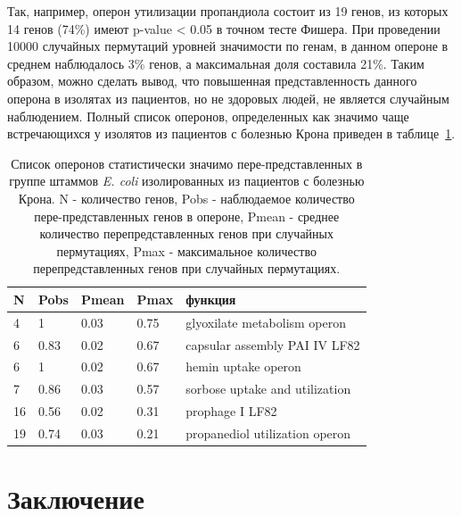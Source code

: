 Так, например, оперон утилизации пропандиола состоит из 19 генов, из которых 14 генов (74\%) имеют p-value < 0.05 в точном тесте Фишера. При проведении 10000 случайных пермутаций уровней значимости по генам, в данном опероне в среднем наблюдалось 3\% генов, а максимальная доля составила 21\%. Таким образом, можно сделать вывод, что повышенная представленность данного оперона в изолятах из пациентов, но не здоровых людей, не является случайным наблюдением. Полный список оперонов, определенных как значимо чаще встречающихся у изолятов из пациентов с болезнью Крона приведен в таблице~\ref{tbl:ops1}. 

\begin{table}[htbp]
\centering
\caption{Список оперонов статистически значимо пере-представленных в группе штаммов \textit{E. coli} изолированных из пациентов с болезнью Крона. N - количество генов, Pobs - наблюдаемое количество пере-представленных генов в опероне, Pmean - среднее количество перепредставленных генов при случайных пермутациях, Pmax - максимальное количество перепредставленных генов при случайных пермутациях.}
\label{tbl:ops1}
\begin{tabular}{|l|l|l|l|l|}
\hline
\textbf{N} & \textbf{Pobs} & \textbf{Pmean} & \textbf{Pmax} & \textbf{функция}                                  \\ \hline
4          & 1             & 0.03          & 0.75         & glyoxilate metabolism operon \\ \hline
6          & 0.83          & 0.02          & 0.67         & capsular assembly PAI IV LF82                              \\ \hline
6          & 1             & 0.02          & 0.67         & hemin uptake operon                                       \\ \hline
7          & 0.86          & 0.03          & 0.57         & sorbose uptake and utilization                             \\ \hline
16         & 0.56          & 0.02          & 0.31         & prophage I LF82                                            \\ \hline
19         & 0.74          & 0.03          & 0.21         & propanediol utilization operon                         \\ \hline
\end{tabular}
\end{table}


\FloatBarrier
{}                                  %
\section*{Заключение}

